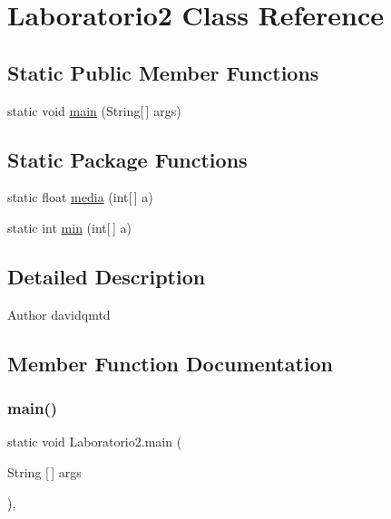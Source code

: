 \hypertarget{class_laboratorio2}{}\section{Laboratorio2 Class Reference}
\label{class_laboratorio2}
\subsection*{Static Public Member Functions}
\begin{DoxyCompactItemize}
\item 
static void \mbox{\hyperlink{class_laboratorio2_a709ec82e5b70e067110ce7891335b56f}{main}} (String\mbox{[}$\,$\mbox{]} args)
\end{DoxyCompactItemize}
\subsection*{Static Package Functions}
\begin{DoxyCompactItemize}
\item 
static float \mbox{\hyperlink{class_laboratorio2_a872976e69a5769bc377228a97fc70405}{media}} (int\mbox{[}$\,$\mbox{]} a)
\item 
static int \mbox{\hyperlink{class_laboratorio2_a1facf757502d39897d554dd5cd9a03fe}{min}} (int\mbox{[}$\,$\mbox{]} a)
\end{DoxyCompactItemize}


\subsection{Detailed Description}
\begin{DoxyAuthor}{Author}
davidqmtd 
\end{DoxyAuthor}


\subsection{Member Function Documentation}
\mbox{\label{class_laboratorio2_a709ec82e5b70e067110ce7891335b56f}} 
\subsubsection{\texorpdfstring{main()}{main()}}
{\footnotesize\ttfamily static void Laboratorio2.\+main (\begin{DoxyParamCaption}\item[{String \mbox{[}$\,$\mbox{]}}]{args }\end{DoxyParamCaption})\hspace{0.3cm}{\ttfamily [inline]}, {\ttfamily [static]}}


